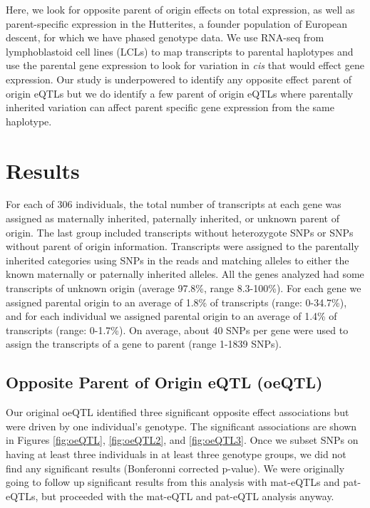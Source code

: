 Here, we look for opposite parent of origin effects on total expression, as well as parent-specific expression in the Hutterites, a founder population of European descent, for which we have phased genotype data\cite{Livne2015}. We use RNA-seq from lymphoblastoid cell lines (LCLs) to map transcripts to parental haplotypes and use the parental gene expression to look for variation in \emph{cis} that would effect gene expression. Our study is underpowered to identify any opposite effect parent of origin eQTLs but we do identify a few parent of origin eQTLs where parentally inherited variation can affect parent specific gene expression from the same haplotype. 

\section{Results}\label{ch04-results}

For each of 306 individuals, the total number of transcripts at each gene was assigned as maternally inherited, paternally inherited, or unknown parent of origin. The last group included transcripts without heterozygote SNPs or SNPs without parent of origin information. Transcripts were assigned to the parentally inherited categories using SNPs in the reads and matching alleles to either the known maternally or paternally inherited alleles. All the genes analyzed had some transcripts of unknown origin (average 97.8\%, range 8.3-100\%). For each gene we assigned parental origin to an average of 1.8\% of transcripts (range: 0-34.7\%), and for each individual we assigned parental origin to an average of 1.4\% of transcripts (range: 0-1.7\%). On average, about 40 SNPs per gene were used to assign the transcripts of a gene to parent (range 1-1839 SNPs). 


\subsection{Opposite Parent of Origin eQTL (oeQTL) }\label{Opposite Parent of Origin eQTL (oeQTL)} 
Our original oeQTL identified three significant opposite effect associations but were driven by one individual's genotype. The significant associations are shown in Figures \ref{fig:oeQTL}, \ref{fig:oeQTL2}, and \ref{fig:oeQTL3}. Once we subset SNPs on having at least three individuals in at least three genotype groups, we did not find any significant results (Bonferonni corrected p-value). We were originally going to follow up significant results from this analysis with mat-eQTLs and pat-eQTLs, but proceeded with the mat-eQTL and pat-eQTL analysis anyway.


